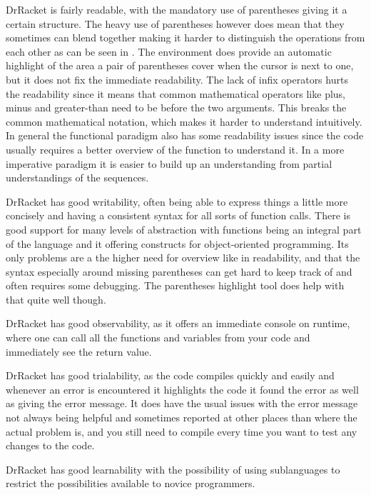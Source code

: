 \begin{description}[style=nextline]
\item[Readability] DrRacket is fairly readable, with the mandatory use of parentheses giving it a certain structure.
The heavy use of parentheses however does mean that they sometimes can blend together making it harder to distinguish the operations from each other as can be seen in .
The environment does provide an automatic highlight of the area a pair of parentheses cover when the cursor is next to one, but it does not fix the immediate readability.
The lack of infix operators hurts the readability since it means that common mathematical operators like plus, minus and greater-than need to be before the two arguments.
This breaks the common mathematical notation, which makes it harder to understand intuitively.
In general the functional paradigm also has some readability issues since the code usually requires a better overview of the function to understand it.
In a more imperative paradigm it is easier to build up an understanding from partial understandings of the sequences.
\item[Writability] DrRacket has good writability, often being able to express things a little more concisely and having a consistent syntax for all sorts of function calls.
There is good support for many levels of abstraction with functions being an integral part of the language and it offering constructs for object-oriented programming.
Its only problems are a the higher need for overview like in readability, and that the syntax especially around missing parentheses can get hard to keep track of and often requires some debugging.
The parentheses highlight tool does help with that quite well though.
\item[Observability] DrRacket has good observability, as it offers an immediate console on runtime, where one can call all the functions and variables from your code and immediately see the return value.
\item[Trialability] DrRacket has good trialability, as the code compiles quickly and easily and whenever an error is encountered it highlights the code it found the error as well as giving the error message.
It does have the usual issues with the error message not always being helpful and sometimes reported at other places than where the actual problem is, and you still need to compile every time you want to test any changes to the code.
\item[Learnability] DrRacket has good learnability with the possibility of using sublanguages to restrict the possibilities available to novice programmers.

\end{description}
